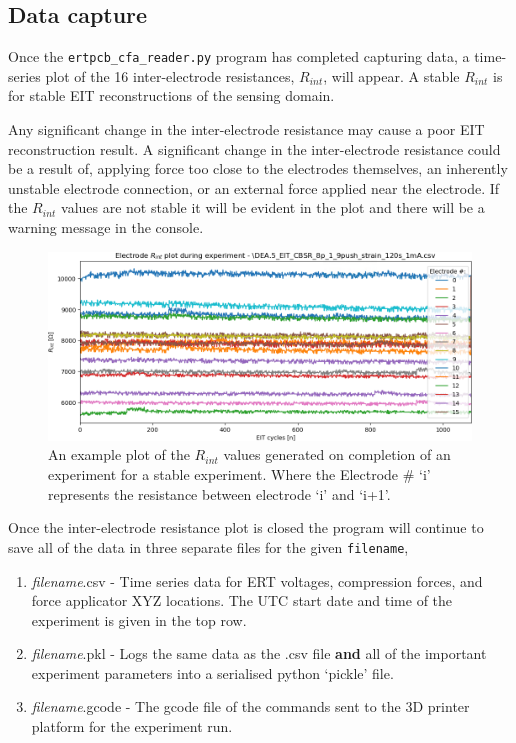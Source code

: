 \subsection{Data capture}
Once the \verb|ertpcb_cfa_reader.py| program has completed capturing data, a time-series plot of the 16 inter-electrode resistances, $R_{int}$, will appear. A stable $R_{int}$ is for stable EIT reconstructions of the sensing domain.  

Any significant change in the inter-electrode resistance may cause a poor EIT reconstruction result. A significant change in the inter-electrode resistance could be a result of, applying force too close to the electrodes themselves, an inherently unstable electrode connection, or an external force applied near the electrode. If the $R_{int}$ values are not stable it will be evident in the plot and there will be a warning message in the console. 
\begin{figure}[H]
	\centering
	\includegraphics[width=0.8\linewidth]{Figures/Rint_plot.png}
	\caption{An example plot of the $R_{int}$ values generated on completion of an experiment for a stable experiment. Where the Electrode \# `i' represents the resistance between electrode `i' and `i+1'.}
	\label{fig:ert_pcb_pinout_mode}
\end{figure}
Once the inter-electrode resistance plot is closed the program will continue to save all of the data in three separate files for the given \verb|filename|,
\begin{enumerate}
	\item \textit{filename}.csv - Time series data for ERT voltages, compression forces, and force applicator XYZ locations. The UTC start date and time of the experiment is given in the top row.  
	\item \textit{filename}.pkl - Logs the same data as the .csv file \textbf{and} all of the important experiment parameters into a serialised python `pickle' file.
	\item \textit{filename}.gcode - The gcode file of the commands sent to the 3D printer platform for the experiment run.
\end{enumerate}


